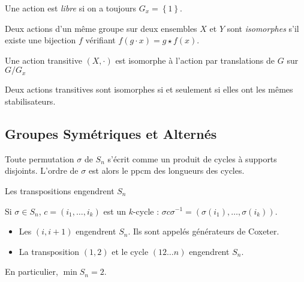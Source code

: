 \documentclass{cours}
\begin{document}
\begin{definition}
    Une action est \emph{libre} si on a toujours $G_{x} = \left\{1\right\}$.
\end{definition}

\begin{definition}
    Deux actions d'un même groupe sur deux ensembles $X$ et $Y$ sont \emph{isomorphes} s'il existe une bijection $f$ vérifiant $f(g \cdot x) = g \star f(x)$.
\end{definition}


\begin{proposition}
    Une action transitive $\left(X, \cdot\right)$ est isomorphe à l'action par translations de $G$ sur $G/G_{x}$
\end{proposition}

\begin{proposition}
    Deux actions transitives sont isomorphes si et seulement si elles ont les mêmes stabilisateurs.
\end{proposition}

\subsection{Groupes Symétriques et Alternés}
\begin{proposition}
    Toute permutation $\sigma$ de $S_{n}$ s'écrit comme un produit de cycles à supports disjoints. L'ordre de $\sigma$ est alors le ppcm des longueurs des cycles.
\end{proposition}

\begin{proposition}
    Les transpositions engendrent $S_{n}$
\end{proposition}
\begin{lemma}
    Si $\sigma \in S_{n}$, $c = \left(i_{1}, \ldots, i_{k}\right)$ est un $k$-cycle : $\sigma c\sigma^{-1} = \left(\sigma(i_{1}), \ldots, \sigma(i_{k})\right)$.
\end{lemma}

\begin{proposition}
    \begin{itemize}
        \item Les $(i, i+1)$ engendrent $S_{n}$. Ils sont appelés générateurs de Coxeter.
        \item La transposition $(1, 2)$ et le cycle $(1 2\ldots n)$ engendrent $S_{n}$.
    \end{itemize}
    En particulier, $\min S_{n} = 2$.
\end{proposition}
\end{document}

